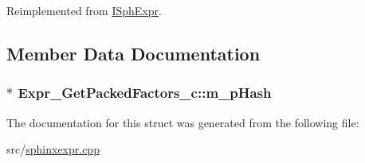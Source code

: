 Reimplemented from \hyperlink{structISphExpr_ac80141a362dc273c71a8415b37f097b8}{I\-Sph\-Expr}.



\subsection{Member Data Documentation}
\hypertarget{structExpr__GetPackedFactors__c_ad0f7a7c9c1498d29eb4764c31d89d03d}{
\subsubsection[{m\-\_\-p\-Hash}]{$\ast$ Expr\-\_\-\-Get\-Packed\-Factors\-\_\-c\-::m\-\_\-p\-Hash}}\label{structExpr__GetPackedFactors__c_ad0f7a7c9c1498d29eb4764c31d89d03d}


The documentation for this struct was generated from the following file\-:\begin{DoxyCompactItemize}
\item 
src/\hyperlink{sphinxexpr_8cpp}{sphinxexpr.\-cpp}\end{DoxyCompactItemize}
